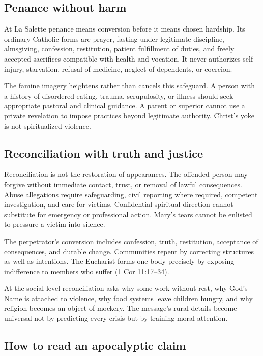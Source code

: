 \subsection{Penance without harm}

At La Salette penance means conversion before it means chosen hardship. Its ordinary Catholic forms are prayer, fasting under legitimate discipline, almsgiving, confession, restitution, patient fulfillment of duties, and freely accepted sacrifices compatible with health and vocation. It never authorizes self-injury, starvation, refusal of medicine, neglect of dependents, or coercion.

The famine imagery heightens rather than cancels this safeguard. A person with a history of disordered eating, trauma, scrupulosity, or illness should seek appropriate pastoral and clinical guidance. A parent or superior cannot use a private revelation to impose practices beyond legitimate authority. Christ's yoke is not spiritualized violence.

\subsection{Reconciliation with truth and justice}

Reconciliation is not the restoration of appearances. The offended person may forgive without immediate contact, trust, or removal of lawful consequences. Abuse allegations require safeguarding, civil reporting where required, competent investigation, and care for victims. Confidential spiritual direction cannot substitute for emergency or professional action. Mary's tears cannot be enlisted to pressure a victim into silence.

The perpetrator's conversion includes confession, truth, restitution, acceptance of consequences, and durable change. Communities repent by correcting structures as well as intentions. The Eucharist forms one body precisely by exposing indifference to members who suffer (1 Cor 11:17--34).

At the social level reconciliation asks why some work without rest, why God's Name is attached to violence, why food systems leave children hungry, and why religion becomes an object of mockery. The message's rural details become universal not by predicting every crisis but by training moral attention.

\subsection{How to read an apocalyptic claim}


